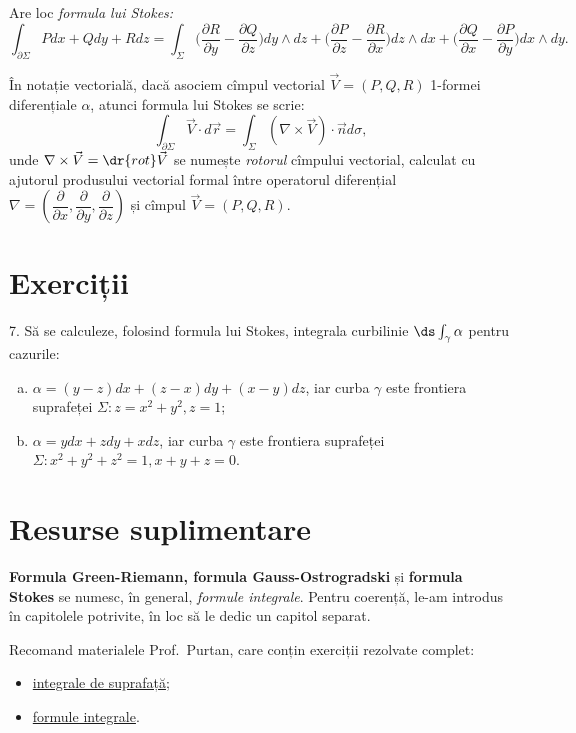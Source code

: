 Are loc \emph{formula lui Stokes:}
\[
  \int_{\partial \Sigma} Pdx + Qdy + Rdz = %
  \int_\Sigma \Big( \frac{\partial R}{\partial y} - %
  \frac{\partial Q}{\partial z} \Big) dy \wedge dz + %
  \Big( \frac{\partial P}{\partial z} - %
  \frac{\partial R}{\partial x} \Big) dz \wedge dx + %
  \Big( \frac{\partial Q}{\partial x} - %
  \frac{\partial P}{\partial y}\Big) dx \wedge dy.
\]

În notație vectorială, dacă asociem cîmpul vectorial $ \vec{V} = (P, Q, R) $
1-formei diferențiale $ \alpha $, atunci formula lui Stokes se scrie:
\[
  \int_{\partial \Sigma} \vec{V} \cdot d\vec{r} = %
  \int_\Sigma (\nabla \times \vec{V}) \cdot \vec{n} d \sigma,
\]
unde $ \nabla \times \vec{V} = \dr{rot} \vec{V} $ se numește \emph{rotorul}
cîmpului vectorial, calculat cu ajutorul produsului vectorial formal între
operatorul diferențial $ \nabla = \left( \dfrac{\partial}{\partial x}, %
\dfrac{\partial}{\partial y}, \dfrac{\partial}{\partial z} \right) $ și
cîmpul $ \vec{V} = (P, Q, R) $.



\section{Exerciții}

7. Să se calculeze, folosind formula lui Stokes, integrala curbilinie
$ \ds\int_\gamma \alpha $ pentru cazurile:
\begin{enumerate}[(a)]
\item $ \alpha = (y - z) dx + (z - x) dy + (x - y) dz $, iar curba $ \gamma $
  este frontiera suprafeței $ \Sigma : z = x^2 + y^2, z = 1 $;
\item $ \alpha = y dx + zdy + xdz $, iar curba $ \gamma $ este frontiera
  suprafeței $ \Sigma: x^2 + y^2 + z^2 = 1, x + y + z = 0 $.
\end{enumerate}


\section{Resurse suplimentare}

\textbf{Formula Green-Riemann, formula Gauss-Ostrogradski} și \textbf{formula Stokes}
se numesc, în general, \emph{formule integrale}. Pentru coerență,
le-am introdus în capitolele potrivite, în loc să le dedic un capitol separat.

Recomand materialele Prof.\ Purtan, care conțin exerciții rezolvate complet:
\begin{itemize}
    \item \href{https://adrianmanea.xyz/docs/18-19-etti-am1/purtan-int-sup.pdf}{integrale de suprafață};
    \item \href{https://adrianmanea.xyz/docs/18-19-etti-am1/purtan-f-int.pdf}{formule integrale}.
\end{itemize}

